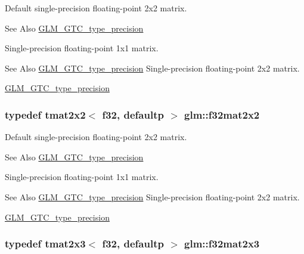 Default single-\/precision floating-\/point 2x2 matrix. \begin{DoxySeeAlso}{See Also}
\hyperlink{group__gtc__type__precision}{G\-L\-M\-\_\-\-G\-T\-C\-\_\-type\-\_\-precision}
\end{DoxySeeAlso}
Single-\/precision floating-\/point 1x1 matrix. \begin{DoxySeeAlso}{See Also}
\hyperlink{group__gtc__type__precision}{G\-L\-M\-\_\-\-G\-T\-C\-\_\-type\-\_\-precision} Single-\/precision floating-\/point 2x2 matrix. 

\hyperlink{group__gtc__type__precision}{G\-L\-M\-\_\-\-G\-T\-C\-\_\-type\-\_\-precision} 
\end{DoxySeeAlso}
\hypertarget{group__gtc__type__precision_gae7ebbb68656a5fd879d536b5d8452fb1}{
\subsubsection[{f32mat2x2}]{\setlength{\rightskip}{0pt plus 5cm}typedef tmat2x2$<$ f32, defaultp $>$ {\bf glm\-::f32mat2x2}}}\label{group__gtc__type__precision_gae7ebbb68656a5fd879d536b5d8452fb1}
Default single-\/precision floating-\/point 2x2 matrix. \begin{DoxySeeAlso}{See Also}
\hyperlink{group__gtc__type__precision}{G\-L\-M\-\_\-\-G\-T\-C\-\_\-type\-\_\-precision}
\end{DoxySeeAlso}
Single-\/precision floating-\/point 1x1 matrix. \begin{DoxySeeAlso}{See Also}
\hyperlink{group__gtc__type__precision}{G\-L\-M\-\_\-\-G\-T\-C\-\_\-type\-\_\-precision} Single-\/precision floating-\/point 2x2 matrix. 

\hyperlink{group__gtc__type__precision}{G\-L\-M\-\_\-\-G\-T\-C\-\_\-type\-\_\-precision} 
\end{DoxySeeAlso}
\hypertarget{group__gtc__type__precision_gac4573d3d213b2bce23943caef565a211}{
\subsubsection[{f32mat2x3}]{\setlength{\rightskip}{0pt plus 5cm}typedef tmat2x3$<$ f32, defaultp $>$ {\bf glm\-::f32mat2x3}}}\label{group__gtc__type__precision_gac4573d3d213b2bce23943caef565a211}
